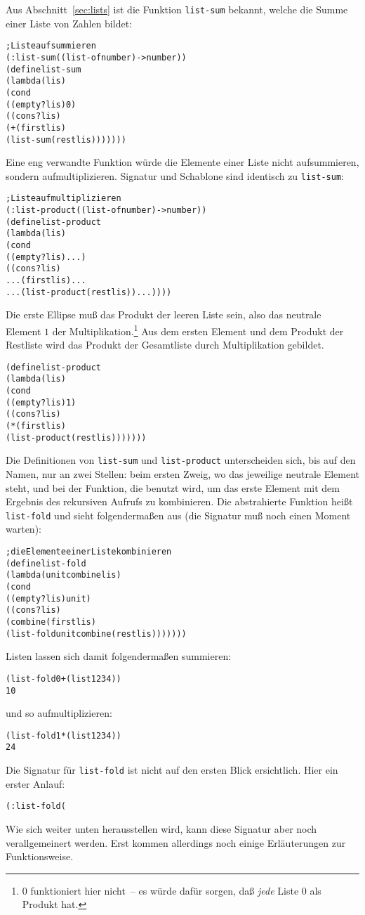Aus Abschnitt~\ref{sec:lists} ist die Funktion \texttt{list-sum}
bekannt, welche die Summe einer Liste von Zahlen bildet:
%
\begin{alltt}
; Liste aufsummieren
(: list-sum ((list-of number) -> number))
(define list-sum
  (lambda (lis)
    (cond
      ((empty? lis) 0)
      ((cons? lis) 
       (+ (first lis)
          (list-sum (rest lis)))))))
\end{alltt}
%
Eine eng verwandte Funktion würde die Elemente einer Liste nicht
aufsummieren, sondern aufmultiplizieren.   Signatur und Schablone sind
identisch zu \texttt{list-sum}:
%
\begin{alltt}
; Liste aufmultiplizieren
(: list-product ((list-of number) -> number))
(define list-product
  (lambda (lis)
    (cond
      ((empty? lis) ...)
      ((cons? lis) 
       ... (first lis) ...
       ... (list-product (rest lis)) ...))))
\end{alltt}
%
Die erste Ellipse muß das Produkt der leeren Liste sein, also das
neutrale Element $1$ der Multiplikation.\footnote{0 funktioniert
  hier nicht~-- es würde dafür sorgen,
  daß \emph{jede} Liste 0 als Produkt hat.} 
Aus dem ersten Element und dem Produkt der
Restliste wird das Produkt der Gesamtliste durch
Multiplikation gebildet.
%
\begin{alltt}
(define list-product
  (lambda (lis)
    (cond
      ((empty? lis) 1)
      ((cons? lis) 
       (* (first lis)
          (list-product (rest lis)))))))
\end{alltt}
%
Die Definitionen von \texttt{list-sum} und \texttt{list-product}
unterscheiden sich, bis auf den Namen, nur an zwei Stellen: beim ersten
Zweig, wo das jeweilige neutrale Element steht, und bei der Funktion,
die benutzt wird, um das erste Element mit dem Ergebnis des rekursiven
Aufrufs zu kombinieren.  Die abstrahierte Funktion heißt
\texttt{list-fold} und sieht folgendermaßen aus (die Signatur muß noch
einen Moment warten):
%
\begin{alltt}
; die Elemente einer Liste kombinieren
(define list-fold
  (lambda (unit combine lis)
    (cond
      ((empty? lis) unit)
      ((cons? lis) 
       (combine (first lis)
                (list-fold unit combine (rest lis)))))))
\end{alltt}
%
Listen lassen sich damit folgendermaßen summieren:
%
\begin{alltt}
(list-fold 0 + (list 1 2 3 4))
\evalsto{} 10
\end{alltt}
%
und so aufmultiplizieren:
%
\begin{alltt}
(list-fold 1 * (list 1 2 3 4))
\evalsto{} 24
\end{alltt}
%
Die Signatur für \texttt{list-fold} ist nicht auf den ersten Blick
ersichtlich.  Hier ein erster Anlauf:
%
\begin{alltt}
(: list-fold (%a (%a %a -> %a) (list-of %a) -> %a))
\end{alltt}
%
Wie sich weiter unten herausstellen wird, kann
diese Signatur aber
noch verallgemeinert werden.  Erst kommen allerdings noch einige
Erläuterungen zur Funktionsweise.

